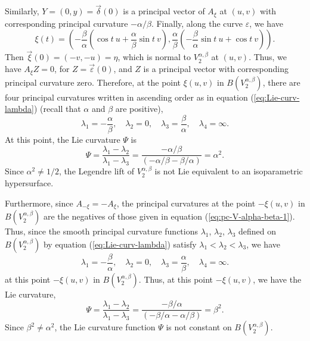 \documentclass[12pt]{article}
\begin{document}
Similarly, $Y = (0,y) = \overrightarrow{\delta} (0)$ is a principal vector of $A_\xi$ at $(u,v)$ with corresponding principal curvature 
$- \alpha / \beta$.  Finally, along the curve $\varepsilon$, we have
\begin{displaymath}
\xi(t) = \left( - \frac{\beta}{\alpha} \left(\cos t \ u + \frac{\alpha}{\beta} \sin t \ v \right), 
\frac{\alpha}{\beta} \left(- \frac{\beta}{\alpha} \sin t \ u + \cos t \ v \right) \right).
\end{displaymath}
Then $\overrightarrow{\xi} (0) = (-v,-u) = \eta$, which is normal to $V^{\alpha,\beta}_2$ at $(u,v)$.  
Thus, we have $A_\xi Z = 0$,
for $Z = \overrightarrow{\varepsilon} (0)$, and $Z$ is a principal vector with corresponding principal curvature zero.  Therefore, at the point
$\xi (u,v)$ in $B(V^{\alpha,\beta}_2)$, there are four principal curvatures written in ascending order as in equation (\ref{eq:Lie-curv-lambda}) (recall that $\alpha$ and $\beta$ are positive),
\begin{equation}
\label{eq:pc-V-alpha-beta-1}
\lambda_1 = - \frac{\alpha}{\beta}, \quad \lambda_2 = 0, \quad \lambda_3 = \frac{\beta}{\alpha}, \quad \lambda_4 = \infty.
\end{equation}
At this point, the Lie curvature $\Psi$ is 
\begin{equation}
\label{eq:Lie-c-lambda-1}
\Psi =  \frac{\lambda_1 - \lambda_2}{\lambda_1 - \lambda_3} = \frac{- \alpha / \beta}{(- \alpha / \beta - \beta / \alpha )} = \alpha^2.
\end{equation}
Since $\alpha^2 \neq 1/2$, the Legendre lift of $V^{\alpha,\beta}_2$ is not 
Lie equivalent to an isoparametric
hypersurface.  


Furthermore, since $A_{- \xi} = - A_{\xi}$, the principal curvatures at the point $- \xi (u,v)$ in $B(V^{\alpha,\beta}_2)$ are the negatives of those given in equation (\ref{eq:pc-V-alpha-beta-1}).
Thus, since the smooth principal curvature functions
$\lambda_1$, $\lambda_2$, $\lambda_3$ defined on $B(V^{\alpha,\beta}_2)$ by equation (\ref{eq:Lie-curv-lambda}) satisfy
$\lambda_1 < \lambda_2 < \lambda_3$, we have
\begin{equation}
\label{eq:pc-V-alpha-beta-2}
\lambda_1 = - \frac{\beta}{\alpha}, \quad \lambda_2 = 0, \quad \lambda_3 = \frac{\alpha}{\beta}, \quad \lambda_4 = \infty.
\end{equation}
at this point $- \xi (u,v)$ in $B(V^{\alpha,\beta}_2)$. Thus, at this point $- \xi (u,v)$, we have the Lie curvature,
\begin{equation}
\label{eq:Lie-c-lambda-2}
\Psi =  \frac{\lambda_1 - \lambda_2}{\lambda_1 - \lambda_3} = \frac{- \beta / \alpha}{(- \beta / \alpha - \alpha / \beta )} = \beta^2.
\end{equation}
Since $\beta^2 \neq \alpha^2$, the Lie curvature function $\Psi$ is not constant on $B(V^{\alpha,\beta}_2)$.
\end{document}
